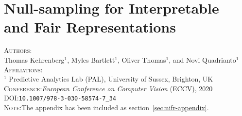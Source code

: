 \chapter{Null-sampling for Interpretable and Fair Representations}\label{ch:nifr}
\textsc{Authors}:\\
Thomas Kehrenberg$^1$, Myles Bartlett$^1$, Oliver Thomas$^1$, and Novi Quadrianto$^1$ \\
\textsc{Affiliations}:\\
$^1$ Predictive Analytics Lab (PAL), University of Sussex, Brighton, UK\\
\textsc{Conference}:\;\;\textit{European Conference on Computer Vision} (ECCV), 2020 \\
\textsc{DOI}:\;\;\texttt{10.1007/978-3-030-58574-7\_34} \\
\textsc{Note}:\;\;The appendix has been included as section~\ref{sec:nifr-appendix}.







\newpage
\appendix

% 
